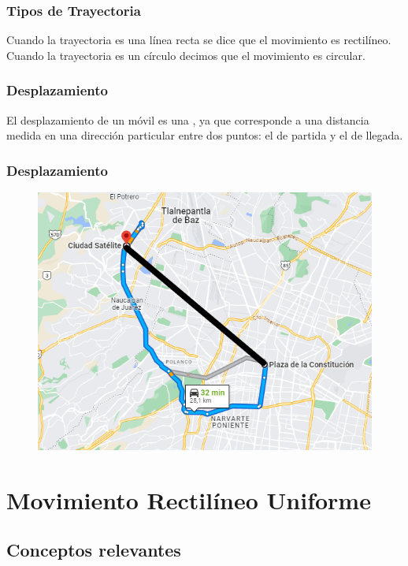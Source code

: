 \documentclass[14pt]{beamer}
\begin{document}
\begin{frame}
\frametitle{Tipos de Trayectoria}
Cuando la trayectoria es una línea recta se dice que el movimiento es rectilíneo.
\\
\bigskip
\pause
Cuando la trayectoria es un círculo decimos que el movimiento es circular.
\end{frame}
\begin{frame}
\frametitle{Desplazamiento}
El desplazamiento de un móvil es una , ya que corresponde a una distancia medida en una dirección particular entre dos puntos: el de partida y el de llegada.
\end{frame}
\begin{frame}
\frametitle{Desplazamiento}
\begin{figure}
    \centering
    \includegraphics[scale=0.45]{Imagenes/Trayectoria_02.png}
\end{figure}
\end{frame}

\section{Movimiento Rectilíneo Uniforme}
\subsection{Conceptos relevantes}
\end{document}
